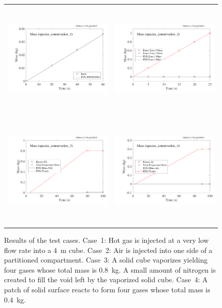 \documentclass[11pt]{book}
\begin{document}
\begin{figure}[ht]
\begin{tabular*}{\textwidth}{lr}
\includegraphics[height=2.2in]{SCRIPT_FIGURES/species_conservation_1} &
\includegraphics[height=2.2in]{SCRIPT_FIGURES/species_conservation_2} \\
\includegraphics[height=2.2in]{SCRIPT_FIGURES/species_conservation_3} &
\includegraphics[height=2.2in]{SCRIPT_FIGURES/species_conservation_4}
\end{tabular*}
\caption[The  test cases]{Results of the  test cases. Case~1: Hot gas is injected at a very low flow rate into a 4~m cube. Case~2: Air is injected into one side of a partitioned compartment. Case~3: A solid cube vaporizes yielding four gases whose total mass is 0.8~kg. A small amount of nitrogen is created to fill the void left by the vaporized solid cube. Case~4: A patch of solid surface reacts to form four gases whose total mass is 0.4~kg.}
\label{species_conservation}
\end{figure}
\end{document}
